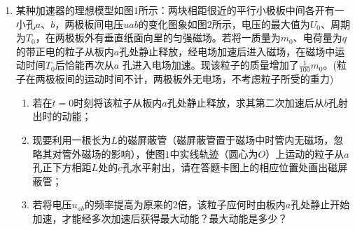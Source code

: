 \begin{enumerate}[leftmargin=0em]
\newpage
\item
{}
某种加速器的理想模型如图$ 1 $所示：两块相距很近的平行小极板中间各开有一小孔$ a $、$ b $，两极板间电压$ uab $的变化图象如图$ 2 $所示，电压的最大值为$ U_{0} $、周期为$ T_{0} $，在两极板外有垂直纸面向里的匀强磁场。若将一质量为$ m_{0} $、电荷量为$ q $的带正电的粒子从板内$ a $孔处静止释放，经电场加速后进入磁场，在磁场中运动时间$ T_{0} $后恰能再次从$ a $ 孔进入电场加速。现该粒子的质量增加了$ \frac{1}{100}m_{0} $。(粒子在两极板间的运动时间不计，两极板外无电场，不考虑粒子所受的重力)
\begin{enumerate}
\renewcommand{\labelenumi}{\arabic{enumi}.}
\item
若在$ t=0 $时刻将该粒子从板内$ a $孔处静止释放，求其第二次加速后从$ b $孔射出时的动能；
\item 
现要利用一根长为$ L $的磁屏蔽管（磁屏蔽管置于磁场中时管内无磁场，忽略其对管外磁场的影响），使图$ 1 $中实线轨迹（圆心为$ O $）上运动的粒子从$ a $孔正下方相距$ L $处的$ c $孔水平射出，请在答题卡图上的相应位置处画出磁屏蔽管；
\item 
若将电压$ u_{ab} $的频率提高为原来的$ 2 $倍，该粒子应何时由板内$ a $孔处静止开始加速，才能经多次加速后获得最大动能？最大动能是多少？



\end{enumerate}
\begin{figure}[h!]
\flushright

\end{figure}





\end{enumerate}
